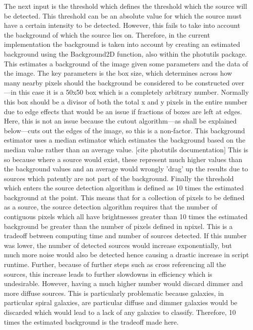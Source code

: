 \documentclass[a4paper,fleqn,usenatbib]{mnras}
\begin{document}
The next input is the threshold which defines the threshold which the source will be detected. This threshold can be an absolute value for which the source must have a certain intensity to be detected. However, this fails to take into account the background of which the source lies on. Therefore, in the current implementation the background is taken into account by creating an estimated background using the Background2D function, also within the photutils package. This estimates a background of the image given some parameters and the data of the image. The key parameters is the box size, which determines across how many nearby pixels should the background be considered to be constructed over---in this case it is a 50x50 box which is a completely arbitrary number. Normally this box should be a divisor of both the total x and y pixels in the entire number due to edge effects that would be an issue if fractions of boxes are left at edges. Here, this is not an issue because the cutout algorithm---as shall be explained below---cuts out the edges of the image, so this is a non-factor. This background estimator uses a median estimator which estimates the background based on the median value rather than an average value. [cite photutils documentation] This is so because where a source would exist, these represent much higher values than the background values and an average would wrongly 'drag' up the results due to sources which patently are not part of the background. Finally the threshold which enters the source detection algorithm is defined as 10 times the estimated background at the point. This means that for a collection of pixels to be defined as a source, the source detection algorithm requires that the number of contiguous pixels which all have brightnesses greater than 10 times the estimated background be greater than the number of pixels defined in npixel. This is a tradeoff between computing time and number of sources detected. If this number was lower, the number of detected sources would increase exponentially, but much more noise would also be detected hence causing a drastic increase in script runtime. Further, because of further steps such as cross referencing all the sources, this increase leads to further slowdowns in efficiency which is undesirable. However, having a much higher number would discard dimmer and more diffuse sources. This is particularly problematic because galaxies, in particular spiral galaxies, are particular diffuse and dimmer galaxies would be discarded which would lead to a lack of any galaxies to classify. Therefore, 10 times the estimated background is the tradeoff made here. 
\end{document}
